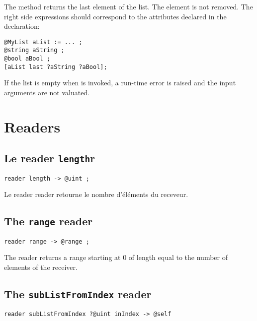 The  method returns the last element of the list. The element is not removed. The right side expressions should correspond to the attributes declared in the  declaration:\\

\begin{lstlisting}[language=galgas]
@MyList aList := ... ;
@string aString ;
@bool aBool ;
[aList last ?aString ?aBool];
\end{lstlisting}


If the list is empty when  is invoked, a run-time error is raised and the input arguments are not valuated.








\section{Readers}

\subsection{Le reader \texttt{length}r}

\begin{lstlisting}[language=galgas]
reader length -> @uint ;
\end{lstlisting}

Le reader  reader retourne le nombre d'éléments du receveur.


\subsection{The \texttt{range} reader}

\begin{lstlisting}[language=galgas]
reader range -> @range ;
\end{lstlisting}

The  reader returns a range starting at $0$ of length equal to the number of elements of the receiver.




\subsection{The \texttt{subListFromIndex} reader}

\begin{lstlisting}[language=galgas]
reader subListFromIndex ?@uint inIndex -> @self
\end{lstlisting}

